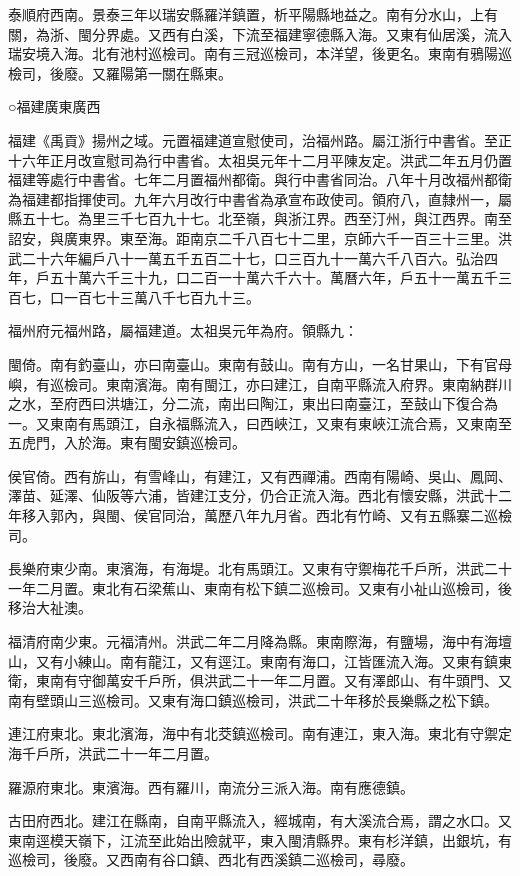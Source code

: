 泰順府西南。景泰三年以瑞安縣羅洋鎮置，析平陽縣地益之。南有分水山，上有關，為浙、閩分界處。又西有白溪，下流至福建寧德縣入海。又東有仙居溪，流入瑞安境入海。北有池村巡檢司。南有三冠巡檢司，本洋望，後更名。東南有鴉陽巡檢司，後廢。又羅陽第一關在縣東。

○福建廣東廣西

福建《禹貢》揚州之域。元置福建道宣慰使司，治福州路。屬江浙行中書省。至正十六年正月改宣慰司為行中書省。太祖吳元年十二月平陳友定。洪武二年五月仍置福建等處行中書省。七年二月置福州都衛。與行中書省同治。八年十月改福州都衛為福建都指揮使司。九年六月改行中書省為承宣布政使司。領府八，直隸州一，屬縣五十七。為里三千七百九十七。北至嶺，與浙江界。西至汀州，與江西界。南至詔安，與廣東界。東至海。距南京二千八百七十二里，京師六千一百三十三里。洪武二十六年編戶八十一萬五千五百二十七，口三百九十一萬六千八百六。弘治四年，戶五十萬六千三十九，口二百一十萬六千六十。萬曆六年，戶五十一萬五千三百七，口一百七十三萬八千七百九十三。

福州府元福州路，屬福建道。太祖吳元年為府。領縣九：

閩倚。南有釣臺山，亦曰南臺山。東南有鼓山。南有方山，一名甘果山，下有官母嶼，有巡檢司。東南濱海。南有閩江，亦曰建江，自南平縣流入府界。東南納群川之水，至府西曰洪塘江，分二流，南出曰陶江，東出曰南臺江，至鼓山下復合為一。又東南有馬頭江，自永福縣流入，曰西峽江，又東有東峽江流合焉，又東南至五虎門，入於海。東有閩安鎮巡檢司。

侯官倚。西有旂山，有雪峰山，有建江，又有西禪浦。西南有陽崎、吳山、鳳岡、澤苗、延澤、仙阪等六浦，皆建江支分，仍合正流入海。西北有懷安縣，洪武十二年移入郭內，與閩、侯官同治，萬歷八年九月省。西北有竹崎、又有五縣寨二巡檢司。

長樂府東少南。東濱海，有海堤。北有馬頭江。又東有守禦梅花千戶所，洪武二十一年二月置。東北有石梁蕉山、東南有松下鎮二巡檢司。又東有小祉山巡檢司，後移治大祉澳。

福清府南少東。元福清州。洪武二年二月降為縣。東南際海，有鹽場，海中有海壇山，又有小練山。南有龍江，又有逕江。東南有海口，江皆匯流入海。又東有鎮東衛，東南有守御萬安千戶所，俱洪武二十一年二月置。又有澤郎山、有牛頭門、又南有壁頭山三巡檢司。又東有海口鎮巡檢司，洪武二十年移於長樂縣之松下鎮。

連江府東北。東北濱海，海中有北茭鎮巡檢司。南有連江，東入海。東北有守禦定海千戶所，洪武二十一年二月置。

羅源府東北。東濱海。西有羅川，南流分三派入海。南有應德鎮。

古田府西北。建江在縣南，自南平縣流入，經城南，有大溪流合焉，謂之水口。又東南逕模天嶺下，江流至此始出險就平，東入閩清縣界。東有杉洋鎮，出銀坑，有巡檢司，後廢。又西南有谷口鎮、西北有西溪鎮二巡檢司，尋廢。

